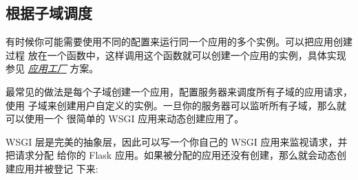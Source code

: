 \documentclass[a4paper,12pt]{sphinxmanual}
\begin{document}
\subsection{根据子域调度}
\label{patterns/appdispatch:id4}
有时候你可能需要使用不同的配置来运行同一个应用的多个实例。可以把应用创建过程
放在一个函数中，这样调用这个函数就可以创建一个应用的实例，具体实现参见
{\hyperref[patterns/appfactories:app-factories]{\emph{应用工厂}}} 方案。

最常见的做法是每个子域创建一个应用，配置服务器来调度所有子域的应用请求，使用
子域来创建用户自定义的实例。一旦你的服务器可以监听所有子域，那么就可以使用一个
很简单的 WSGI 应用来动态创建应用了。

WSGI 层是完美的抽象层，因此可以写一个你自己的 WSGI 应用来监视请求，并把请求分配
给你的 Flask 应用。如果被分配的应用还没有创建，那么就会动态创建应用并被登记
下来:
\end{document}
